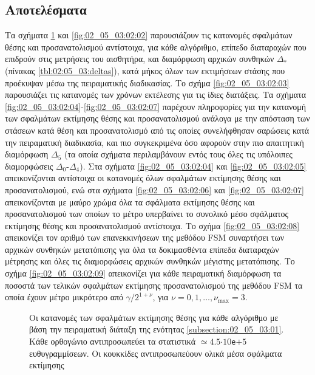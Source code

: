 \subsection{Αποτελέσματα}
\label{subsection:02_05_03:02}

Τα σχήματα \ref{fig:02_05_03:02:01} και \ref{fig:02_05_03:02:02} παρουσιάζουν
τις κατανομές σφαλμάτων θέσης και προσανατολισμού αντίστοιχα, για κάθε
αλγόριθμο, επίπεδο διαταραχών που επιδρούν στις μετρήσεις του αισθητήρα, και
διαμόρφωση αρχικών συνθηκών $\Delta_\ast$ (πίνακας \ref{tbl:02:05_03:deltas}),
κατά μήκος όλων των εκτιμήσεων στάσης που προέκυψαν μέσω της πειραματικής
διαδικασίας. Το σχήμα \ref{fig:02_05_03:02:03} παρουσιάζει τις κατανομές των
χρόνων εκτέλεσης για τις ίδιες διατάξεις. Τα σχήματα
\ref{fig:02_05_03:02:04}-\ref{fig:02_05_03:02:07} παρέχουν πληροφορίες για την
κατανομή των σφαλμάτων εκτίμησης θέσης και προσανατολισμού ανάλογα με την
απόσταση των στάσεων κατά θέση και προσανατολισμό από τις οποίες συνελήφθησαν
σαρώσεις κατά την πειραματική διαδικασία, και πιο συγκεκριμένα όσο αφορούν στην
πιο απαιτητική διαμόρφωση $\Delta_5$ (τα οποία σχήματα περιλαμβάνουν εντός τους
όλες τις υπόλοιπες διαμορφώσεις $\Delta_0$-$\Delta_4$). Στα σχήματα
\ref{fig:02_05_03:02:04} και \ref{fig:02_05_03:02:05} απεικονίζονται αντίστοιχα
οι κατανομές όλων σφαλμάτων εκτίμησης θέσης και προσανατολισμού, ενώ στα
σχήματα \ref{fig:02_05_03:02:06} και \ref{fig:02_05_03:02:07} απεικονίζονται με
μαύρο χρώμα όλα τα σφάλματα εκτίμησης θέσης και προσανατολισμού των οποίων το
μέτρο υπερβαίνει το συνολικό μέσο σφάλματος εκτίμησης θέσης και προσανατολισμού
αντίστοιχα. Το σχήμα \ref{fig:02_05_03:02:08} απεικονίζει τον αριθμό των
επανεκκινήσεων της μεθόδου FSM συναρτήσει των αρχικών συνθηκών μετατόπισης για
όλα τα δοκιμασθέντα επίπεδα διαταραχών μέτρησης και όλες τις διαμορφώσεις
αρχικών συνθηκών μέγιστης μετατόπισης. Το σχήμα \ref{fig:02_05_03:02:09}
απεικονίζει για κάθε πειραματική διαμόρφωση τα ποσοστά των τελικών σφαλμάτων
εκτίμησης προσανατολισμού της μεθόδου FSM τα οποία έχουν μέτρο μικρότερο από
$\gamma/2^{1+\nu}$, για $\nu = 0, 1, \dots, \nu_{\max} = 3$.

\begin{figure}\vspace{1cm}\hspace{0.5cm}
  
  \vspace{-4cm}
  \caption{\small Οι κατανομές των σφαλμάτων εκτίμησης θέσης για κάθε αλγόριθμο
           με βάση την πειραματική διάταξη της ενότητας
           \ref{subsection:02_05_03:01}. Κάθε ορθογώνιο αντιπροσωπεύει τα
           στατιστικά $\simeq 4.5$$\cdot$$10$\texttt{e}$+$$5$ ευθυγραμμίσεων.
           Οι κουκκίδες αντιπροσωπεύουν ολικά μέσα σφάλματα εκτίμησης}
  \label{fig:02_05_03:02:01}
\end{figure}

